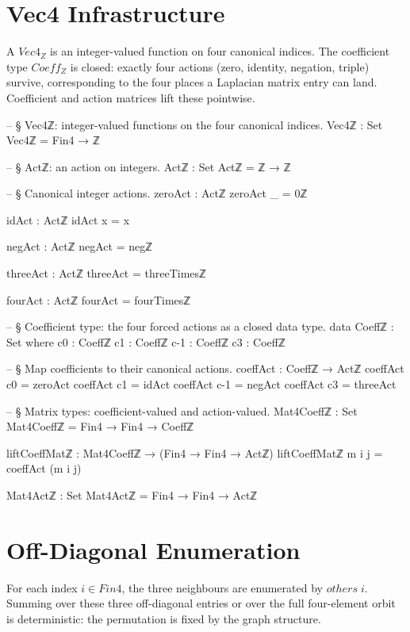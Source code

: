 \documentclass[11pt,a4paper]{book}
\def\mathrm#1{#1}%
\def\mathbb#1{#1}%
\begin{document}
\section{Vec4 Infrastructure}

A $\mathrm{Vec4}_{\mathbb{Z}}$ is an integer-valued function on four canonical indices.
The coefficient type $\mathrm{Coeff}_{\mathbb{Z}}$ is closed: exactly four actions (zero, identity, negation, triple) survive, corresponding to the four places a Laplacian matrix entry can land.
Coefficient and action matrices lift these pointwise.

\begin{code}
-- § Vec4ℤ: integer-valued functions on the four canonical indices.
Vec4ℤ : Set
Vec4ℤ = Fin4 → ℤ

-- § Actℤ: an action on integers.
Actℤ : Set
Actℤ = ℤ → ℤ

-- § Canonical integer actions.
zeroAct : Actℤ
zeroAct _ = 0ℤ

idAct : Actℤ
idAct x = x

negAct : Actℤ
negAct = negℤ

threeAct : Actℤ
threeAct = threeTimesℤ

fourAct : Actℤ
fourAct = fourTimesℤ

-- § Coefficient type: the four forced actions as a closed data type.
data Coeffℤ : Set where
  c0  : Coeffℤ
  c1  : Coeffℤ
  c-1 : Coeffℤ
  c3  : Coeffℤ

-- § Map coefficients to their canonical actions.
coeffAct : Coeffℤ → Actℤ
coeffAct c0 = zeroAct
coeffAct c1 = idAct
coeffAct c-1 = negAct
coeffAct c3 = threeAct

-- § Matrix types: coefficient-valued and action-valued.
Mat4Coeffℤ : Set
Mat4Coeffℤ = Fin4 → Fin4 → Coeffℤ

liftCoeffMatℤ : Mat4Coeffℤ → (Fin4 → Fin4 → Actℤ)
liftCoeffMatℤ m i j = coeffAct (m i j)

Mat4Actℤ : Set
Mat4Actℤ = Fin4 → Fin4 → Actℤ
\end{code}

\section{Off-Diagonal Enumeration}

For each index $i \in \mathrm{Fin4}$, the three neighbours are enumerated by $\mathrm{others}\;i$.
Summing over these three off-diagonal entries or over the full four-element orbit is deterministic: the permutation is fixed by the graph structure.
\end{document}
